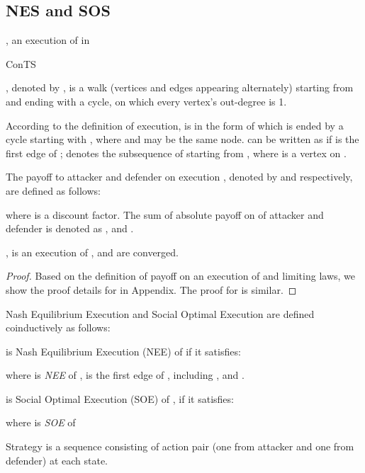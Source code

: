 \documentclass{acm_proc_article-sp}
\begin{document}
\subsection{NES and SOS}
\begin{definition}
, an \textsf{execution} of  in \begin{bf}{ConTS}\end{bf}, denoted by , is a walk (vertices and edges appearing alternately) starting from  and ending with a cycle, on which every vertex's out-degree is 1.
\end{definition}
According to the definition of execution,  is in the form of  which is ended by a cycle starting with , where  and  may be the same node.  can be written as  if  is the first edge of ;
 denotes the subsequence of  starting from , where  is a vertex on .
\begin{definition}
The \textsf{payoff} to attacker and defender on execution , denoted by  and  respectively, are defined as follows:

where  is a discount factor. The sum of absolute payoff on  of attacker and defender is denoted as , and  .
\end{definition}
\begin{Theorem}
\label{payoffconverged}
,  is an execution of ,  and   are converged.
\end{Theorem}
\begin{proof}
Based on the definition of payoff on an execution of  and limiting laws, we show the proof details for  in Appendix. The proof for  is similar.
\end{proof}
Nash Equilibrium Execution and Social Optimal Execution are defined coinductively \cite{davide07} as follows:
\begin{definition}
 is \textsf{Nash Equilibrium Execution (NEE)} of  if it satisfies:

where  is \textit{NEE} of ,  is the first edge of ,  including , and  .
\end{definition}

\begin{definition}
 is \textsf{Social Optimal Execution (SOE)} of , if it satisfies:

where  is \textit{SOE} of 
\end{definition}

\begin{definition}
\textsf{Strategy} is a sequence consisting of action pair (one from attacker and one from defender) at each state.
\end{definition}
\end{document}
